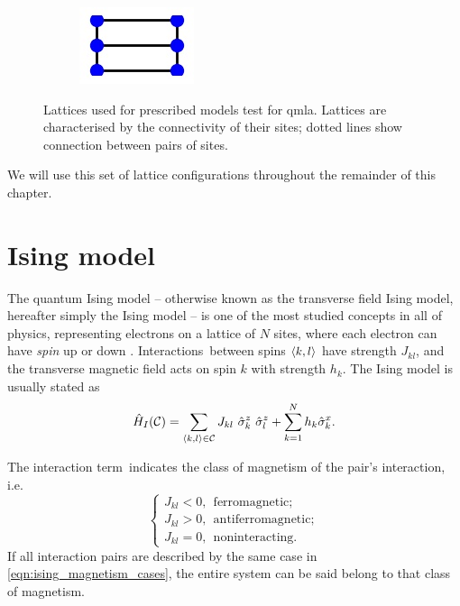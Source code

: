 \begin{figure}
\begin{center}
\begin{subfigure}{2.25cm}
            \caption{}
        \end{subfigure}
        \qquad
        \begin{subfigure}{2cm} 
            \includegraphics{theoretical_study/figures/lattices/_6_site_grid.jpg}        
            \caption{}
        \end{subfigure}
    \end{center}
    \caption[Lattices for prescribed QMLA exploration strategy]{
        Lattices used for prescribed models test for \gls{qmla}.
        Lattices are characterised by the connectivity of their sites; 
            dotted lines show connection between pairs of sites.                 
    }
    \label{fig:lattices}
\end{figure}

We will use this set of lattice configurations throughout the remainder of this chapter. 

\section{Ising model}\label{sec:ising}
The quantum Ising model -- otherwise known as the transverse field Ising model, hereafter simply the Ising model -- 
    is one of the most studied concepts in all of physics, 
    representing electrons on a lattice of $N$ sites, 
    where each electron can have \emph{spin} up or down 
    \cite{ising1925beitrag, onsager1944crystal, brush1967history}.
Interactions\footnotemark \ between spins ${ \langle k, l \rangle }$ have strength $J_{kl}$, 
    and the transverse magnetic field acts on spin $k$ with strength $h_k$. 
The Ising model is usually stated as 
\begin{equation}
    \label{eqn:ising_standard_form}
    \hat{H}_I(\cc) = \sum_{\bkl \in \mathcal{C}} J_{kl}  \ \hat{\sigma}_k^z \ \hat{\sigma}_{l}^z + \sum_{k=1}^{N} h_k \hat{\sigma}_{k}^x.
\end{equation}

The interaction term\footnotemark \ indicates the class of magnetism of the pair's interaction, i.e. 
\begin{equation}
    \label{eqn:ising_magnetism_cases}
    \begin{cases}
        J_{kl} < 0, \ \ \textrm{ferromagnetic}; \\
        J_{kl} > 0, \ \ \textrm{antiferromagnetic}; \\
        J_{kl} = 0, \ \ \textrm{noninteracting}.
    \end{cases}
\end{equation}
If all interaction pairs are described by the same case in \cref{eqn:ising_magnetism_cases}, 
    the entire system can be said belong to that class of magnetism. 

